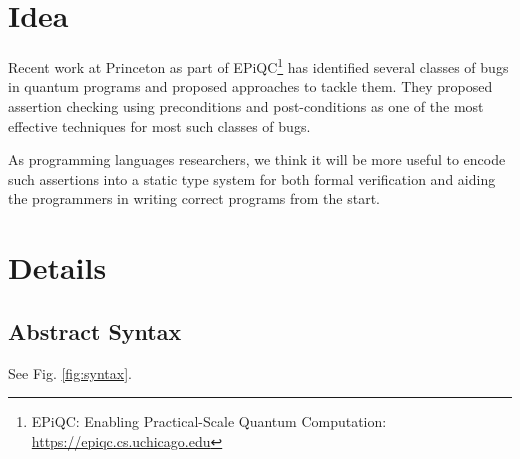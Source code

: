 \documentclass[acmsmall,nonacm]{acmart}\settopmatter{printfolios=true,printccs=false,printacmref=false}
\begin{document}
\section{Idea}
%

Recent work at Princeton as part of EPiQC\footnote{EPiQC: Enabling Practical-Scale Quantum Computation:  \url{https://epiqc.cs.uchicago.edu}}\cite{huang2018,huang2019} has identified several classes of bugs in quantum programs and proposed approaches to tackle them. They proposed assertion checking using preconditions and post-conditions as one of the most effective techniques for most such classes of bugs.

As programming languages researchers, we think it will be more useful to encode such assertions into a static type system for both formal verification and aiding the programmers in writing correct programs from the start.

\section{Details}

\subsection{Abstract Syntax}

See Fig. \ref{fig:syntax}.
\end{document}
